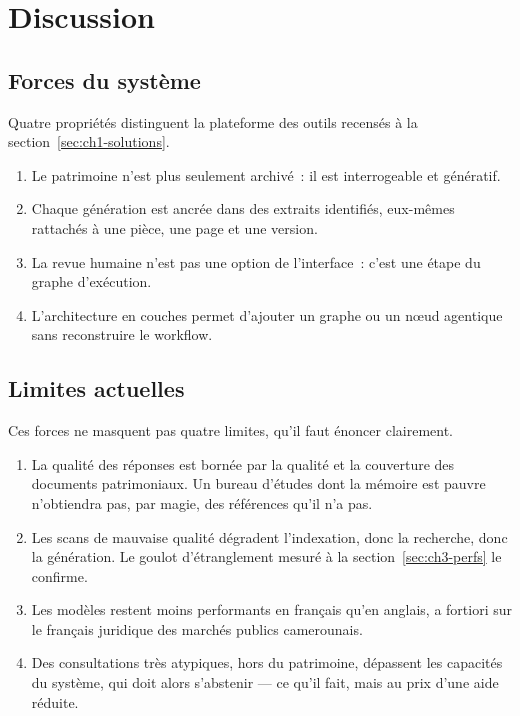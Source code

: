 \section{Discussion}
\label{sec:ch3-discussion}

\subsection{Forces du système}

Quatre propriétés distinguent la plateforme des outils recensés à la
section~\ref{sec:ch1-solutions}.

\begin{enumerate}
  \item {} Le patrimoine n'est plus seulement
        archivé~: il est interrogeable et génératif.
  \item {} Chaque génération est ancrée dans des
        extraits identifiés, eux-mêmes rattachés à une pièce, une page et
        une version.
  \item {} La revue humaine n'est pas une
        option de l'interface~: c'est une étape du graphe d'exécution.
  \item {} L'architecture en couches permet d'ajouter
        un graphe ou un n\oe ud agentique sans reconstruire le workflow.
\end{enumerate}

\subsection{Limites actuelles}

Ces forces ne masquent pas quatre limites, qu'il faut énoncer clairement.

\begin{enumerate}
  \item {} La qualité des réponses est bornée
        par la qualité et la couverture des documents patrimoniaux. Un
        bureau d'études dont la mémoire est pauvre n'obtiendra pas, par
        magie, des références qu'il n'a pas.
  \item {} Les scans de mauvaise qualité dégradent
        l'indexation, donc la recherche, donc la génération. Le goulot
        d'étranglement mesuré à la section~\ref{sec:ch3-perfs} le confirme.
  \item {} Les modèles restent moins
        performants en français qu'en anglais, a fortiori sur le français
        juridique des marchés publics camerounais.
  \item {} Des consultations très
        atypiques, hors du patrimoine, dépassent les capacités du système,
        qui doit alors s'abstenir --- ce qu'il fait, mais au prix d'une
        aide réduite.
\end{enumerate}

